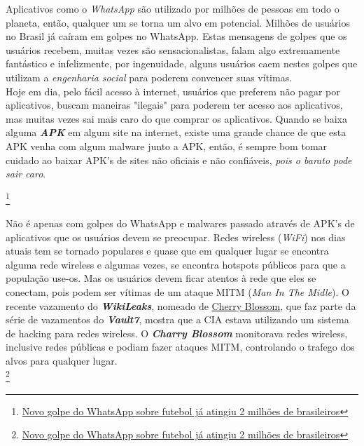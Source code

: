 \documentclass[12pt, letterpaper, DejaVuSansMono:12]{report}
\begin{document}
	Aplicativos como o \textit{WhatsApp} são utilizado por milhões de pessoas em todo o planeta, então, qualquer um se torna um alvo em potencial. Milhões de usuários no Brasil já caíram em golpes no WhatsApp. Estas mensagens de golpes que os usuários recebem, muitas vezes são sensacionalistas, falam algo extremamente fantástico e infelizmente, por ingenuidade, alguns usuários caem nestes golpes que utilizam a \textit{engenharia social} para poderem convencer suas vítimas.\\

	Hoje em dia, pelo fácil acesso à internet, usuários que preferem não pagar por aplicativos, buscam maneiras "ilegais" para poderem ter acesso aos aplicativos, mas muitas vezes sai mais caro do que comprar os aplicativos. Quando se baixa alguma \textbf{\textit{APK}} em algum site na internet, existe uma grande chance de que esta APK venha com algum malware junto a APK, então, é sempre bom tomar cuidado ao baixar APK's de sites não oficiais e não confiáveis, \textit{pois o barato pode sair caro}.


\footnote{\href{https://www.tecmundo.com.br/whatsapp/116247-novo-golpe-whatsapp-futebol-atingiu-2-milhoes-brasileiros.htm}{Novo golpe do WhatsApp sobre futebol já atingiu 2 milhões de brasileiros}}

	Não é apenas com golpes do WhatsApp e malwares passado através de APK's de aplicativos que os usuários devem se preocupar. Redes wireless (\textit{WiFi}) nos dias atuais tem se tornado populares e quase que em qualquer lugar se encontra alguma rede wireless e algumas vezes, se encontra hotspots públicos para que a população use-os. Mas os usuários devem ficar atentos à rede que eles se conectam, pois podem ser vítimas de um ataque MITM (\textit{Man In The Midle}). O recente vazamento do \textbf{\textit{WikiLeaks}}, nomeado de \href{https://wikileaks.org/vault7/#Cherry\%20Blossom}{Cherry Blossom}, que faz parte da série de vazamentos do \textit{\textbf{Vault7}}, mostra que a CIA estava utilizando um sistema de hacking para redes wireless. O \textbf{\textit{Charry Blossom}} monitorava redes wireless, inclusive redes públicas e podiam fazer ataques MITM, controlando o trafego dos alvos para qualquer lugar.\\

\footnote{\href{https://www.tecmundo.com.br/whatsapp/116247-novo-golpe-whatsapp-futebol-atingiu-2-milhoes-brasileiros.htm}{Novo golpe do WhatsApp sobre futebol já atingiu 2 milhões de brasileiros}}

\pagebreak
\end{document}
